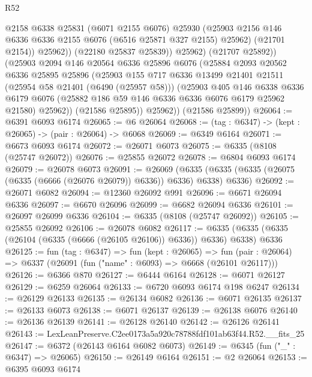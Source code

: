 \begin{lexlean}{R52}
\begin{coremodule}
                    @2158
                    @6338
                    @25831
                    (@6071 @2155 @6076)
                    @25930
                    (@25903 @2156 @146 @6336 @6336 @2155 @6076 (@6516 @25871 @327 @2155) @25962)
                    (@21701 @2154))
                  @25962))
              (@22180 @25837 @25839))
            @25962)
          (@21707 @25892))
        (@25903
          @2094
          @146
          @20564
          @6336
          @25896
          @6076
          (@25884
            @2093
            @20562
            @6336
            @25895
            @25896
            (@25903
              @155
              @717
              @6336
              @13499
              @21401
              @21511
              (@25954 @58 @21401 (@6490 (@25957 @58)))
              (@25903
                @405
                @146
                @6338
                @6336
                @6179
                @6076
                (@25882 @186 @59 @146 @6336 @6336 @6076 @6179 @25962 @21580)
                @25962))
            (@21586 @25895))
          @25962))
      (@21586 @25899))
@26064 := @6391 @6093 @6174
@26065 := @6 @26064
@26068 := (tag : @6347) -> (kept : @26065) -> (pair : @26064) -> @6068
@26069 := @6349 @6164
@26071 := @6673 @6093 @6174
@26072 := @26071 @6073
@26075 := @6335 (@8108 (@25747 @26072))
@26076 := @25855 @26072
@26078 := @6804 @6093 @6174
@26079 := @26078 @6073
@26091 := @26069
    (@6335 (@6335 (@6335 (@26075 (@6335 (@6666 (@26076 @26079)) @6336)) @6336) @6338) @6336)
@26092 := @26071 @6082
@26094 := @12360 @26092 @991
@26096 := @6671 @26094 @6336
@26097 := @6670 @26096
@26099 := @6682 @26094 @6336
@26101 := @26097 @26099 @6336
@26104 := @6335 (@8108 (@25747 @26092))
@26105 := @25855 @26092
@26106 := @26078 @6082
@26117 := @6335 (@6335 (@6335 (@26104 (@6335 (@6666 (@26105 @26106)) @6336)) @6336) @6338) @6336
@26125 := fun (tag : @6347) =>
  fun (kept : @26065) =>
  fun (pair : @26064) => @6337 (@26091 (fun ("name" : @6093) => @6668 (@26101 @26117)))
@26126 := @6366 @870
@26127 := @6444 @6164
@26128 := @6071 @26127
@26129 := @6259 @26064
@26133 := @6720 @6093 @6174 @198 @6247
@26134 := @26129 @26133
@26135 := @26134 @6082
@26136 := @6071 @26135
@26137 := @26133 @6073
@26138 := @6071 @26137
@26139 := @26138 @6076
@26140 := @26136 @26139
@26141 := @26128 @26140
@26142 := @26126 @26141
@26143 := LexLeanPreserve.C2ee0173a5a920c78788fdf101ab63f44.R52.__fits_25
@26147 := @6372 (@26143 @6164 @6082 @6073)
@26149 := @6345 (fun ("_" : @6347) => @26065)
@26150 := @26149 @6164
@26151 := @2 @26064
@26153 := @6395 @6093 @6174

\end{coremodule}
\end{lexlean}
